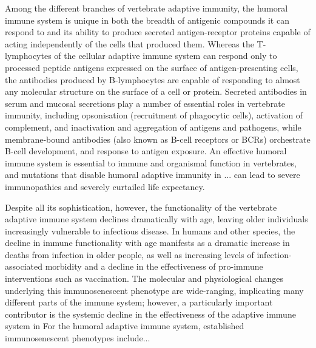 Among the different branches of vertebrate adaptive immunity, the humoral immune system is unique in both the breadth of antigenic compounds it can respond to and its ability to produce secreted antigen-receptor proteins capable of acting independently of the cells that produced them. Whereas the T-lymphocytes of the cellular adaptive immune system can respond only to processed peptide antigens expressed on the surface of antigen-presenting cells, the antibodies produced by B-lymphocytes are capable of responding to almost any molecular structure on the surface of a cell or protein. Secreted antibodies in serum and mucosal secretions play a number of essential roles in vertebrate immunity, including opsonisation (recruitment of phagocytic cells), activation of complement, and inactivation and aggregation of antigens and pathogens, while membrane-bound antibodies (also known as B-cell receptors or BCRs) orchestrate B-cell development, and response to antigen exposure. An effective humoral immune system is essential to immune and organismal function in vertebrates, and mutations that disable humoral adaptive immunity in ...%
can lead to severe immunopathies and severely curtailed life expectancy. %


Despite all its sophistication, however, the functionality of the vertebrate adaptive immune system declines dramatically with age, leaving older individuals increasingly vulnerable to infectious disease. In humans and other species, the decline in immune functionality with age manifests as a dramatic increase in deaths from infection in older people, as well as increasing levels of infection-associated morbidity and a decline in the effectiveness of pro-immune interventions such as vaccination. The molecular and physiological changes underlying this immunosenescent phenotype are wide-ranging, implicating many different parts of the immune system; however, a particularly important contributor is the systemic decline in the effectiveness of the adaptive immune system in %
For the humoral adaptive immune system, established immunosenescent phenotypes include... %

